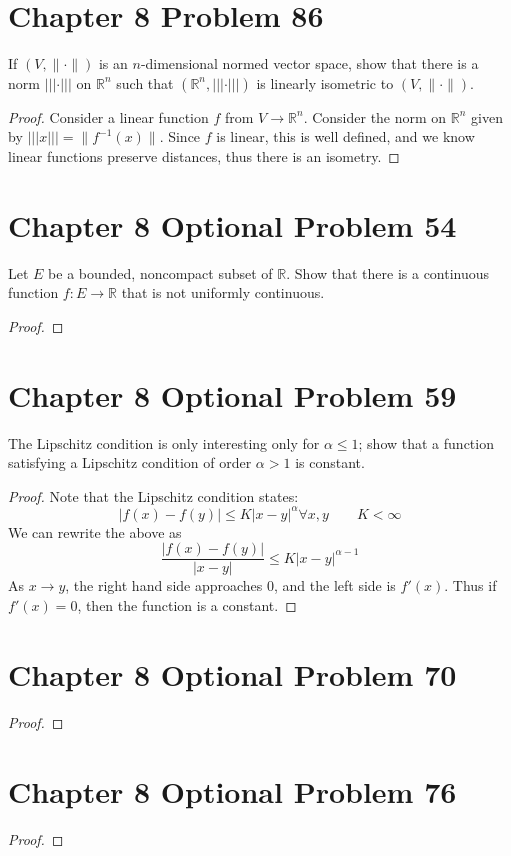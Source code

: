 \documentclass{article}
\newtheorem{proof}{Proof}
\def\le{\leqslant}
\def\to{\rightarrow}
\def\RR{\mathbb R}
\begin{document}
\section{Chapter 8 Problem 86}
If $(V,\|\cdot\|)$ is an $n$-dimensional normed vector space, show that
there is a norm $|||\cdot|||$ on $\RR^n$ such that $(\RR^n,|||\cdot|||)$
is linearly isometric to $(V,\|\cdot\|)$.
\begin{proof}
Consider a linear function $f$ from $V\to\RR^{n}$.
Consider the norm on $\RR^n$ given by $|||x||| = \|f^{-1}(x)\|$.
Since $f$ is linear, this is well defined, and we know linear functions
preserve distances, thus there is an isometry.
\end{proof}

\section{Chapter 8 Optional Problem 54}
Let $E$ be a bounded, noncompact subset of $\RR$. Show that
there is a continuous function $f:E \to \RR$ that is not
uniformly continuous.
\begin{proof}

\end{proof}

\section{Chapter 8 Optional Problem 59}
The Lipschitz condition is only interesting only for $\alpha \le 1$;
show that a function satisfying a Lipschitz condition of order $\alpha>1$
is constant.
\begin{proof}
Note that the Lipschitz condition states:
\[
|f(x)-f(y)| \le K|x-y|^\alpha \forall x,y\qquad K < \infty
\]
We can rewrite the above as
\[
\frac{|f(x)-f(y)|}{|x-y|} \le K|x-y|^{\alpha-1}
\]
As $x\to y$, the right hand side approaches 0, and the left side
is $f'(x)$. Thus if $f'(x)=0$, then the function is a constant.
\end{proof}
\section{Chapter 8 Optional Problem 70}
\begin{proof}

\end{proof}

\section{Chapter 8 Optional Problem 76}
\begin{proof}

\end{proof}
\end{document}
